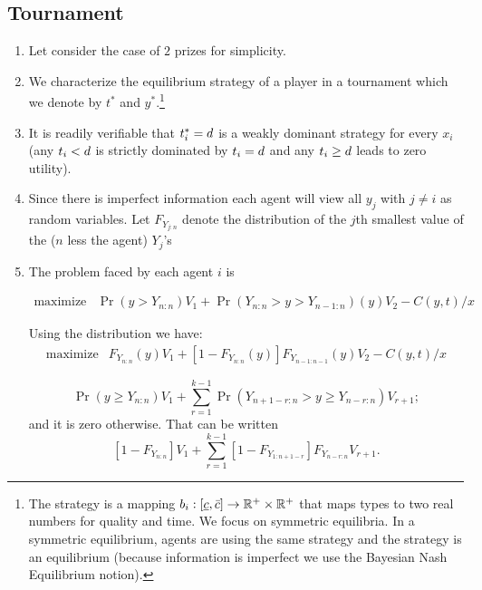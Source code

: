 \documentclass[11pt]{article}
\begin{document}
\subsection{Tournament}
\begin{enumerate}[label=>>]

\item Let consider the case of $2$ prizes for simplicity.

\item  We characterize the equilibrium strategy of a player in a tournament which we denote by $t^*$ and $y^*$.\footnote{The strategy is a mapping $b_i:[\underline{c}, \bar{c}]\rightarrow \mathbb{R}^+ \times \mathbb{R}^+$ that maps types to two real numbers for quality and time. We focus on symmetric equilibria. In a symmetric equilibrium, agents are using the same strategy and the strategy is an equilibrium (because information is imperfect we use the Bayesian Nash Equilibrium notion).} 


\item It is readily verifiable that $t_i^*= d$ is a weakly dominant strategy  for every $x_i$ (any $t_i < d$ is strictly dominated by $t_i=d$ and any $t_i\geq d$ leads to zero utility).


\item Since there is imperfect information each agent will view all $y_j$ with $j\neq i$ as random variables. Let $F_{Y_{j:n}}$ denote the distribution of the $j$th smallest value of the ($n$ less the agent) $Y_j$'s 

\item The problem faced by each agent $i$ is

\begin{equation}
  \begin{array}{ll}
    \mbox{maximize} & \Pr(y > Y_{n:n}) V_1 + \Pr(Y_{n:n} > y > Y_{n-1:n}) (y)  V_2 - C(y, t) / x  
  \end{array}
\end{equation}

Using the distribution we have:
\begin{equation}
  \begin{array}{ll}
    \mbox{maximize} & F_{Y_{n:n}} (y) V_1 + [1 - F_{Y_{n:n}} (y)] F_{Y_{n-1:n-1}} (y)  V_2 - C(y, t) / x 
  \end{array}
\end{equation}

    


\[
  \Pr(y \geq Y_{n:n}) V_1 + \sum_{r=1}^{k-1} \Pr(Y_{n+1-r:n} > y \geq Y_{n-r:n}) V_{r+1};
\]
and it is zero otherwise. That can be written
\[
  [1 - F_{Y_{n:n}}] V_1 +  \sum_{r=1}^{k-1} [1 - F_{Y_{1:n+1-r}}]  F_{Y_{n-r:n}} V_{r+1}.
\]



\end{enumerate}
\end{document}
